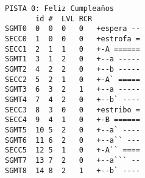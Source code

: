 \begin{verbatim}
PISTA 0: Feliz Cumpleaños 
       id #  LVL RCR
SGMT0  0  0  0   0   +espera --
SECC0  1  0  0   0   +estrofa =
SECC1  2  1  1   0   +-A ======
SGMT1  3  1  2   0   +--a -----
SGMT2  4  2  2   0   +--b -----
SECC2  5  2  1   0   +-A` =====
SGMT3  6  3  2   1   +--a -----
SGMT4  7  4  2   0   +--b` ----
SECC3  8  3  0   0   +estribo =
SECC4  9  4  1   0   +-B ======
SGMT5  10 5  2   0   +--a` ----
SGMT6  11 6  2   0   +--a`` ---
SECC5  12 5  1   0   +-A`` ====
SGMT7  13 7  2   0   +--a``` --
SGMT8  14 8  2   1   +--b` ----

\end{verbatim}
